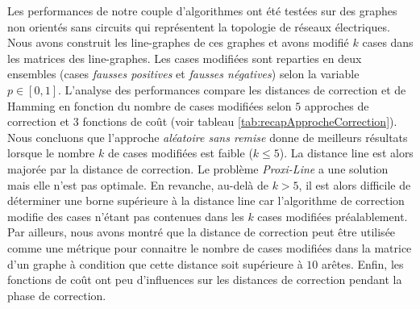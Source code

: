 
Les performances de notre couple d'algorithmes ont \'et\'e test\'ees sur des graphes non orient\'es sans circuits qui repr\'esentent la topologie de r\'eseaux \'electriques. Nous avons construit les line-graphes de ces graphes et avons modifi\'e $k$ cases dans les matrices des line-graphes. Les cases modifi\'ees sont reparties en deux ensembles (cases {\em fausses positives} et {\em fausses n\'egatives}) selon la variable $p \in [0,1]$.
L'analyse des performances compare les distances de correction et de Hamming en fonction du nombre de cases modifi\'ees selon $5$ approches de correction et $3$ fonctions de co\^ut (voir tableau \ref{tab:recapApprocheCorrection}). 
Nous concluons que l'approche {\em al\'eatoire sans remise} donne de meilleurs r\'esultats lorsque le nombre $k$ de cases modifi\'ees est faible ($k\le 5$). La distance line est alors major\'ee par la distance de correction.  Le probl\`eme {\em Proxi-Line} a une solution mais elle n'est pas optimale.
En revanche, au-del\`a de $k > 5$, il est alors difficile de d\'eterminer une borne sup\'erieure \`a la distance line car l'algorithme de correction  modifie des cases n'\'etant pas contenues dans les $k$ cases modifi\'ees pr\'ealablement. 
Par ailleurs, nous avons montr\'e que la distance de correction peut \^etre utilis\'ee comme une m\'etrique pour connaitre le nombre de cases modifi\'ees dans la matrice d'un graphe \`a condition que cette distance soit sup\'erieure \`a $10$ ar\^etes. 
Enfin, les fonctions de co\^ut ont peu d'influences sur les distances de correction pendant la phase de correction.

